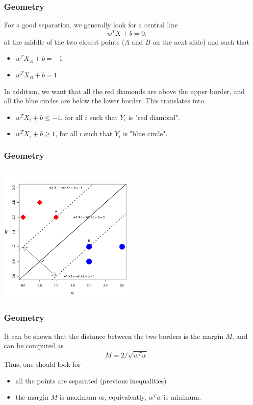 \begin{frame}
\frametitle{Geometry}
For a good separation, we generally look for a central line 
$$
w^TX + b = 0,
$$ 
at the middle of the two closest points ($A$ and $B$ on the next slide) and such that 
\begin{itemize}
\item $w^T X_A + b = -1$
\item $w^T X_B + b = 1$
\end{itemize}
In addition, we want that all the red diamonds are above the upper border, and all the blue circles are below the lower border. This translates into
\begin{itemize}
\item $w^T X_i + b \leq -1$, for all $i$ such that $Y_i$ is "red diamond".
\item $w^T X_i + b \geq 1$, for all $i$ such that $Y_i$ is "blue circle".
\end{itemize}
\end{frame}
\begin{frame}
\frametitle{Geometry}
\begin{center}
\includegraphics[width=7cm]{../../Graphs/SVM_Borders_5.png}
\end{center}
\end{frame}
\begin{frame}
\frametitle{Geometry}
It can be shown that the distance between the two borders is the margin $M$, and can be computed as 
$$
M=2/\sqrt{w^T w}.
$$
Thus, one should look for 
\begin{itemize}
\item all the points are separated (previous inequalities) 
\item the margin $M$ is maximum or, equivalently, $w^Tw$ is minimum.
\end{itemize}
\end{frame}
